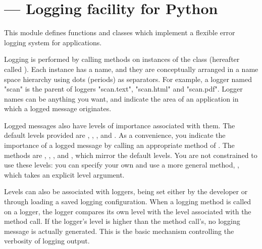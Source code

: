 \section{ ---
         Logging facility for Python}






This module defines functions and classes which implement a flexible
error logging system for applications.

Logging is performed by calling methods on instances of the
 class (hereafter called ). Each instance has a
name, and they are conceptually arranged in a name space hierarchy
using dots (periods) as separators. For example, a logger named
"scan" is the parent of loggers "scan.text", "scan.html" and "scan.pdf".
Logger names can be anything you want, and indicate the area of an
application in which a logged message originates.

Logged messages also have levels of importance associated with them.
The default levels provided are , ,
,  and . As a
convenience, you indicate the importance of a logged message by calling
an appropriate method of . The methods are
, , ,  and
, which mirror the default levels. You are not
constrained to use these levels: you can specify your own and use a
more general  method, , which takes an
explicit level argument.

Levels can also be associated with loggers, being set either by the
developer or through loading a saved logging configuration. When a
logging method is called on a logger, the logger compares its own
level with the level associated with the method call. If the logger's
level is higher than the method call's, no logging message is actually
generated. This is the basic mechanism controlling the verbosity of
logging output.

